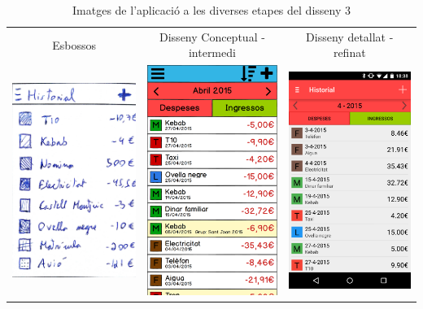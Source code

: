 \begin{table}
\caption{Imatges de l'aplicació a les diverses etapes del disseny 3}
\label{table:images_app3}
\begin{tabular}{| c | c | c |}
\hline
Esbossos & Disseny Conceptual - intermedi & Disseny detallat - refinat \\
\includegraphics[width=50mm]{1_History.jpg} &
\includegraphics[width=50mm]{2_History.png} &
\includegraphics[width=50mm]{3_History.png}  \\

\end{tabular}
\end{table}
